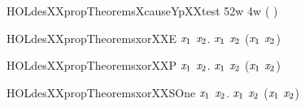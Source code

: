 \newcommand{\HOLdesXXpropTheoremsXcauseYFpXXeq}{\UseVerbatim{HOLdesXXpropTheoremsXcauseYFpXXeq}}
\begin{SaveVerbatim}{HOLdesXXpropTheoremsXcauseYpXXtest}
\HOLTokenTurnstile{}  52w 4w  ( \HOLSymConst{/} )
\end{SaveVerbatim}
\newcommand{\HOLdesXXpropTheoremsXcauseYpXXtest}{\UseVerbatim{HOLdesXXpropTheoremsXcauseYpXXtest}}
\begin{SaveVerbatim}{HOLdesXXpropTheoremsxorXXE}
\HOLTokenTurnstile{} \HOLSymConst{\HOLTokenForall{}}\ensuremath{\HOLBoundVar{x}\sb{\mathrm{1}}} \ensuremath{\HOLBoundVar{x}\sb{\mathrm{2}}}.  \ensuremath{\HOLBoundVar{x}\sb{\mathrm{1}}} \HOLSymConst{\HOLTokenEor{}}  \ensuremath{\HOLBoundVar{x}\sb{\mathrm{2}}} \HOLSymConst{=}  (\ensuremath{\HOLBoundVar{x}\sb{\mathrm{1}}} \HOLSymConst{\HOLTokenEor{}} \ensuremath{\HOLBoundVar{x}\sb{\mathrm{2}}})
\end{SaveVerbatim}
\newcommand{\HOLdesXXpropTheoremsxorXXE}{\UseVerbatim{HOLdesXXpropTheoremsxorXXE}}
\begin{SaveVerbatim}{HOLdesXXpropTheoremsxorXXP}
\HOLTokenTurnstile{} \HOLSymConst{\HOLTokenForall{}}\ensuremath{\HOLBoundVar{x}\sb{\mathrm{1}}} \ensuremath{\HOLBoundVar{x}\sb{\mathrm{2}}}.  \ensuremath{\HOLBoundVar{x}\sb{\mathrm{1}}} \HOLSymConst{\HOLTokenEor{}}  \ensuremath{\HOLBoundVar{x}\sb{\mathrm{2}}} \HOLSymConst{=}  (\ensuremath{\HOLBoundVar{x}\sb{\mathrm{1}}} \HOLSymConst{\HOLTokenEor{}} \ensuremath{\HOLBoundVar{x}\sb{\mathrm{2}}})
\end{SaveVerbatim}
\newcommand{\HOLdesXXpropTheoremsxorXXP}{\UseVerbatim{HOLdesXXpropTheoremsxorXXP}}
\begin{SaveVerbatim}{HOLdesXXpropTheoremsxorXXSOne}
\HOLTokenTurnstile{} \HOLSymConst{\HOLTokenExists{}}\ensuremath{\HOLBoundVar{x}\sb{\mathrm{1}}} \ensuremath{\HOLBoundVar{x}\sb{\mathrm{2}}}.  \ensuremath{\HOLBoundVar{x}\sb{\mathrm{1}}} \HOLSymConst{\HOLTokenEor{}}  \ensuremath{\HOLBoundVar{x}\sb{\mathrm{2}}} \HOLSymConst{\HOLTokenNotEqual{}}  (\ensuremath{\HOLBoundVar{x}\sb{\mathrm{1}}} \HOLSymConst{\HOLTokenEor{}} \ensuremath{\HOLBoundVar{x}\sb{\mathrm{2}}})
\end{SaveVerbatim}
\newcommand{\HOLdesXXpropTheoremsxorXXSOne}{\UseVerbatim{HOLdesXXpropTheoremsxorXXSOne}}
